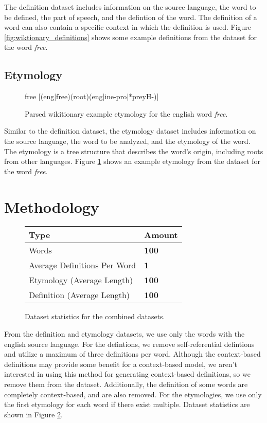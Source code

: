 \documentclass[11pt,a4paper]{article}
\begin{document}
The definition dataset includes information on the source language, the word to
be defined, the part of speech, and the defintion of the word. The definition of
a word can also contain a specific context in which the definition is used.
Figure \ref{fig:wiktionary_definitions} shows some example definitions from the
dataset for the word \textit{free}.

\subsection{Etymology}

\begin{figure}
  \color{blue}free \color{black}[\color{green}(eng|free)\color{blue}(root)\color{red}(eng|ine-pro|*preyH-)\color{black}]
  \caption{Parsed wikitionary example etymology for the english word
    \textit{free}.}
  \label{fig:wiktionary_etymology}
\end{figure}

Similar to the definition dataset, the etymology dataset includes information on
the source language, the word to be analyzed, and the etymology of the word. The
etymology is a tree structure that describes the word's origin, including roots
from other languages. Figure \ref{fig:wiktionary_etymology} shows an example
etymology from the dataset for the word \textit{free}.

\section{Methodology}

\begin{figure}[h]
  \begin{tabular}{|l|l|}
    \hline
    \textbf{Type}                & \textbf{Amount} \\
    \hline\hline
    Words                        & \textbf{100}    \\
    Average Definitions Per Word & \textbf{1}      \\
    Etymology (Average Length)   & \textbf{100}    \\
    Definition (Average Length)  & \textbf{100}    \\
    \hline
  \end{tabular}
  \caption{Dataset statistics for the combined datasets.}
  \label{fig:dataset_stats}
\end{figure}

From the definition and etymology datasets, we use only the words with the
english source language. For the defintions, we remove self-referential
defintions and utilize a maximum of three definitions per word. Although the
context-based definitions may provide some benefit for a context-based model, we
aren't interested in using this method for generating context-based definitions,
so we remove them from the dataset. Additionally, the definition of some words
are completely context-based, and are also removed. For the etymologies, we use
only the first etymology for each word if there exist multiple. Dataset
statistics are shown in Figure \ref{fig:dataset_stats}.
\end{document}
